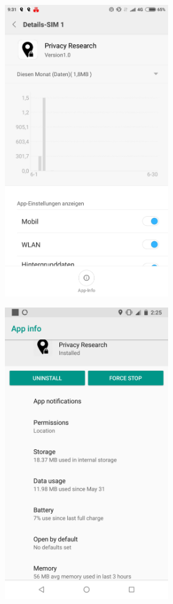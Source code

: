 \begin{center}
\includegraphics[width=200pt]{data/data-usage/data-usage2-2.jpeg}
\end{center}
\begin{center}
\includegraphics[width=200pt]{data/data-usage/data-usage3.png}
\end{center}
